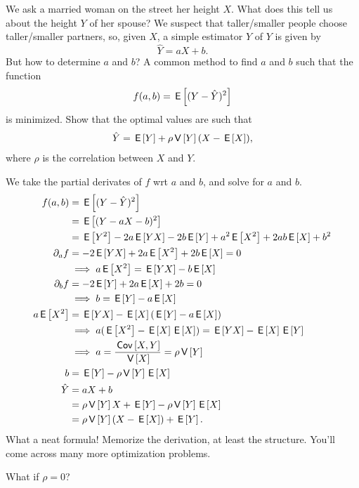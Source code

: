 \begin{exercise}
We ask a married woman on the street her height $X$. What does this tell us about the height $Y$ of her spouse? We suspect that taller/smaller people choose  taller/smaller partners, so, given $X$, a simple estimator $\hat Y$ of $Y$ is given by
\begin{equation*}
  \hat Y = a X + b.
\end{equation*}
But how to determine $a$ and $b$? A common method to find $a$ and $b$ such that the function
\begin{equation*}
  f(a,b) = \E{(Y-\hat Y)^2}
\end{equation*}
is minimized. Show that the optimal values are such that
\begin{align*}
  \hat Y = \E Y + \rho \V Y (X - \E X),
\end{align*}
where $\rho$ is the correlation between $X$ and $Y$.

\begin{solution}
We take the partial derivates of $f$ wrt $a$ and $b$, and solve for $a$ and $b$.
  \begin{align*}
f(a,b) &= \E{(Y-\hat Y)^2} \\
 &= \E{(Y-a X - b)^2} \\
 &= \E{Y^{2}} - 2a\E{YX} - 2b\E Y + a^{2}\E{X^2} + 2 ab \E X + b^{2}\\
\partial_{a} f &=-2 \E{YX} + 2a \E{X^2} + 2 b \E X = 0 \\
&\implies a \E{X^2} =  \E{YX}  -  b \E X \\
\partial_{b} f &=-2 \E{Y}  + 2 a \E X  + 2 b= 0 \\
& \implies  b = \E Y - a \E{X}\\
a \E{X^2} &=  \E{YX}  -  \E X (\E Y - a \E X) \\
&\implies  a (\E{X^{2}} - \E X \E X)  = \E{YX} - \E X \E Y  \\
&\implies a = \frac{\cov{X,Y}}{\V X} = \rho \V Y\\
b &= \E Y - \rho \V Y \E X\\
\hat Y &= a X + b \\
&= \rho \V Y X + \E Y - \rho \V Y \E X \\
&= \rho \V Y (X-\E X)  + \E Y.
  \end{align*}
What a neat formula! Memorize the derivation, at least the structure. You'll come across many more optimization problems.

What if $\rho=0$?
\end{solution}
\end{exercise}



